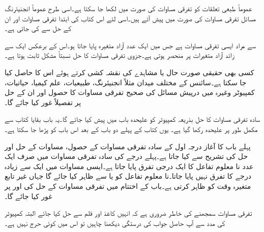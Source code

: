 عموماً طبعی تعلقات کو تفرقی مساوات کی صورت میں لکھا جا سکتا ہے۔اسی طرح عموماً انجنیئرنگ مسائل تفرقی مساوات کی صورت میں پیش آتے ہیں۔اسی لئے  اس کتاب کی ابتدا تفرقی مساوات اور ان کے حل سے کی جاتی ہے۔

 سے مراد ایسی تفرقی مساوات ہے جس میں ایک عدد آزاد متغیرہ پایا جاتا ہو۔اس کے برعکس  ایک سے زائد آزاد متغیرات پر منحصر ہوتی ہے۔جزوی تفرقی مساوات کا حل نسبتاً مشکل ثابت ہوتا ہے۔

کسی بھی حقیقی صورت حال یا مشاہدے کی نقشہ کشی کرتے ہوئے  اس کا  حاصل کیا جا سکتا ہے۔سائنس کے مختلف میدان مثلاً انجنیئرنگ، طبیعیات، علم کیمیا، حیاتیات، کمپیوٹر وغیرہ میں درپیش مسائل کی صحیح تفرقی مساوات کا حصول اور ان کے حل پر تفصیلاً غور کیا جائے گا۔

سادہ تفرقی مساوات کا حل بذریعہ کمپیوٹر کو علیحدہ باب میں  پیش کیا جائے گا۔یہ باب بقایا کتاب سے مکمل طور پر علیحدہ رکھا گیا ہے۔ یوں کتاب کے پہلے  دو باب کے بعد اس باب کو پڑھا جا سکتا ہے۔

پہلے باب کا آغاز  درجہ اول کے سادہ تفرقی مساوات کے حصول، مساوات کے حل اور حل کی تشریح  سے کیا جاتا ہے۔پہلے درجے کی سادہ تفرقی مساوات میں صرف ایک عدد نا معلوم تفاعل کا ایک درجی تفرق پایا جاتا ہے۔ایسی مساوات میں ایک سے زیادہ درجے کا تفرق نہیں پایا جاتا۔نا معلوم تفاعل کو  یا  سے ظاہر کیا جائے گا جہاں غیر تابع متغیرہ    وقت کو ظاہر کرتی ہے۔باب کے اختتام میں تفرقی مساوات کے حل کی   اور  پر غور کیا جائے گا۔

تفرقی مساوات سمجھنے کی خاطر ضروری ہے کہ انہیں کاغذ اور قلم سے حل کیا جائے البتہ کمپیوٹر کی مدد سے آپ حاصل جواب کی درستگی دیکھنا چاہیں تو اس میں کوئی حرج نہیں ہے۔

